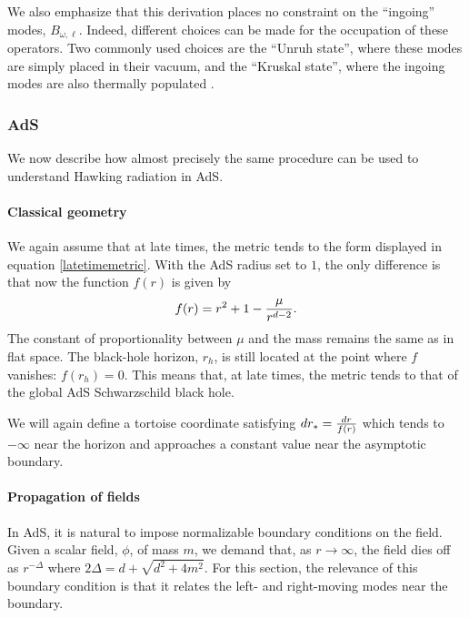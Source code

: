 \documentclass[12pt]{article}
\def\rtor{{r_*}}
\newcommand{\be}{\begin{equation}}
\newcommand{\ee}{\end{equation}}
\begin{document}
We also emphasize that this derivation places no constraint on the ``ingoing'' modes, $B_{\omega, \ell}$.  Indeed, different choices can be made for the occupation of these operators. Two commonly used choices are the ``Unruh state'', where these modes are simply placed in their vacuum, and the ``Kruskal state'', where the ingoing modes are also thermally populated \cite{Candelas:1980zt}.



\subsubsection{AdS \label{adshawkingderiv}} 
We now describe how almost precisely the same procedure can be used to understand Hawking radiation in AdS. 

\paragraph{\bf Classical geometry \\}
We again assume that at late times, the metric tends to the form displayed in equation \eqref{latetimemetric}. With the AdS radius set to $1$, the only difference is that now the function $f(r)$ is given by
\be
\label{fadsexplicit}
f(r) = r^2 + 1 - {\mu \over r^{d-2}}.
\ee
The constant of proportionality between $\mu$ and the mass remains the same as in flat space. The black-hole horizon, $r_h$, is still located at the point where $f$ vanishes: $f(r_h) = 0$.  This means that, at late times, the metric tends to that of the global AdS Schwarzschild black hole.

We will again define a tortoise coordinate satisfying $d \rtor = {d r \over f(r)}$ which tends to $-\infty$ near the horizon and approaches a constant value near the asymptotic boundary.

\paragraph{\bf Propagation of fields \\}
In AdS, it is natural to impose normalizable boundary conditions on the field. Given a scalar field, $\phi$, of mass $m$, we demand that, as $r \rightarrow \infty$, the field dies off as $r^{-\Delta}$ where $2 \Delta = d + \sqrt{d^2 + 4 m^2}$. For this section, the relevance of this boundary condition is that it relates the left- and right-moving modes near the boundary.
\end{document}
